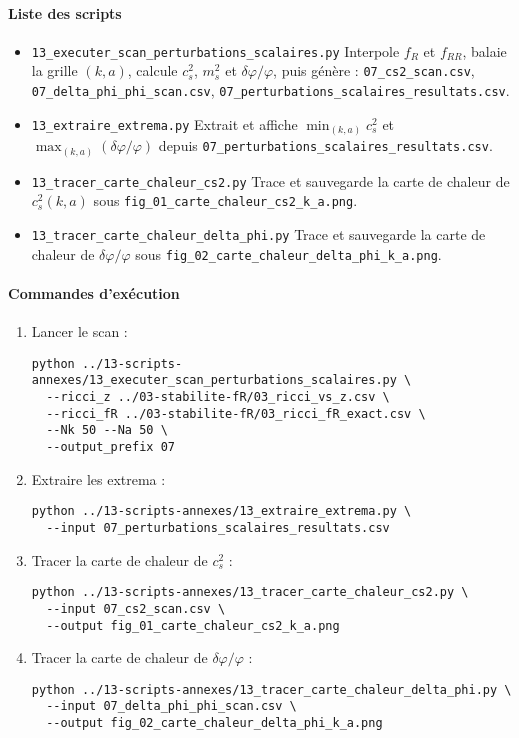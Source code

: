 \paragraph{Liste des scripts}
\begin{itemize}
  \item \texttt{13\_executer\_scan\_perturbations\_scalaires.py}
        Interpole \(f_{R}\) et \(f_{RR}\), balaie la grille \((k,a)\), calcule \(c_{s}^{2}\), \(m_{s}^{2}\) et \(\delta\varphi/\varphi\), puis génère :
        \texttt{07\_cs2\_scan.csv},
        \texttt{07\_delta\_phi\_phi\_scan.csv},
        \texttt{07\_perturbations\_scalaires\_resultats.csv}.
  \item \texttt{13\_extraire\_extrema.py}
        Extrait et affiche
        \(\min_{(k,a)}c_{s}^{2}\) et \(\max_{(k,a)}(\delta\varphi/\varphi)\)
        depuis \texttt{07\_perturbations\_scalaires\_resultats.csv}.
  \item \texttt{13\_tracer\_carte\_chaleur\_cs2.py}
        Trace et sauvegarde la carte de chaleur de \(c_{s}^{2}(k,a)\) sous
        \texttt{fig\_01\_carte\_chaleur\_cs2\_k\_a.png}.
  \item \texttt{13\_tracer\_carte\_chaleur\_delta\_phi.py}
        Trace et sauvegarde la carte de chaleur de \(\delta\varphi/\varphi\) sous
        \texttt{fig\_02\_carte\_chaleur\_delta\_phi\_k\_a.png}.
\end{itemize}

\paragraph*{Commandes d’exécution}
\begin{enumerate}
  \item Lancer le scan :
\begin{verbatim}
python ../13-scripts-annexes/13_executer_scan_perturbations_scalaires.py \
  --ricci_z ../03-stabilite-fR/03_ricci_vs_z.csv \
  --ricci_fR ../03-stabilite-fR/03_ricci_fR_exact.csv \
  --Nk 50 --Na 50 \
  --output_prefix 07
\end{verbatim}
  \item Extraire les extrema :
\begin{verbatim}
python ../13-scripts-annexes/13_extraire_extrema.py \
  --input 07_perturbations_scalaires_resultats.csv
\end{verbatim}
  \item Tracer la carte de chaleur de \(c_{s}^{2}\) :
\begin{verbatim}
python ../13-scripts-annexes/13_tracer_carte_chaleur_cs2.py \
  --input 07_cs2_scan.csv \
  --output fig_01_carte_chaleur_cs2_k_a.png
\end{verbatim}
  \item Tracer la carte de chaleur de \(\delta\varphi/\varphi\) :
\begin{verbatim}
python ../13-scripts-annexes/13_tracer_carte_chaleur_delta_phi.py \
  --input 07_delta_phi_phi_scan.csv \
  --output fig_02_carte_chaleur_delta_phi_k_a.png
\end{verbatim}
\end{enumerate}

